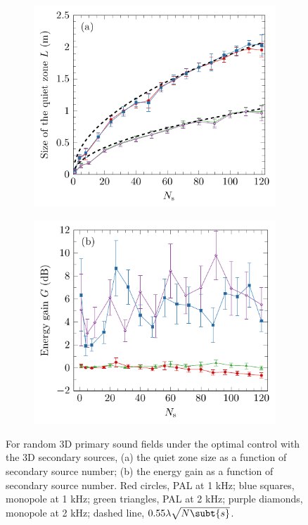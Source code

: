 \begin{figure}[!htb]
    \centering
    \begin{subfigure}{0.49\textwidth}
        \centering
        \includegraphics[width = \textwidth]{fig/200408A_size_v2}
    \end{subfigure}
    \begin{subfigure}{0.49\textwidth}
        \centering
        \includegraphics[width = \textwidth]{fig/200408A_gain_v3}
    \end{subfigure}
    \caption{For random 3D primary sound fields under the optimal control with the 3D secondary sources, (a) the quiet zone size as a function of secondary source number; (b) the energy gain as a function of secondary source number. Red circles, PAL at 1 kHz; blue squares, monopole at 1 kHz; green triangles, PAL at 2 kHz; purple diamonds, monopole at 2 kHz; dashed line, $0.55\lambda\sqrt{N\subt{s}}$.}
    \label{fig:ancpalqz_3dpri_3dsec_vary_secnum}
\end{figure}

